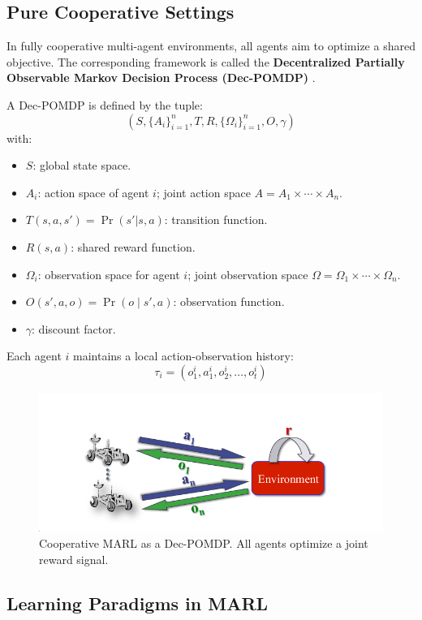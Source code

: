 \documentclass[../Main.tex]{subfiles}
\begin{document}
\subsection{Pure Cooperative Settings}

In fully cooperative multi-agent environments, all agents aim to optimize a shared objective. The corresponding framework is called the \textbf{Decentralized Partially Observable Markov Decision Process (Dec-POMDP)} \cite{oliehoek2016concise}.

A Dec-POMDP is defined by the tuple:
\[
(S, \{A_i\}_{i=1}^n, T, R, \{\Omega_i\}_{i=1}^n, O, \gamma)
\]
with:
\begin{itemize}
    \item \( S \): global state space.
    \item \( A_i \): action space of agent \( i \); joint action space \( A = A_1 \times \cdots \times A_n \).
    \item \( T(s, a, s') = \Pr(s'|s, a) \): transition function.
    \item \( R(s, a) \): shared reward function.
    \item \( \Omega_i \): observation space for agent \( i \); joint observation space \( \Omega = \Omega_1 \times \cdots \times \Omega_n \).
    \item \( O(s', a, o) = \Pr(o \mid s', a) \): observation function.
    \item \( \gamma \): discount factor.
\end{itemize}

Each agent \( i \) maintains a local action-observation history:
\[
\tau_i = (o^i_1, a^i_1, o^i_2, \dots, o^i_t)
\]

\begin{figure}[H]
    \centering
    \includegraphics[width=0.75\linewidth]{img/full-cooperation.png}
    \caption{Cooperative MARL as a Dec-POMDP. All agents optimize a joint reward signal.}
\end{figure}


\subsection{Learning Paradigms in MARL}
\end{document}
